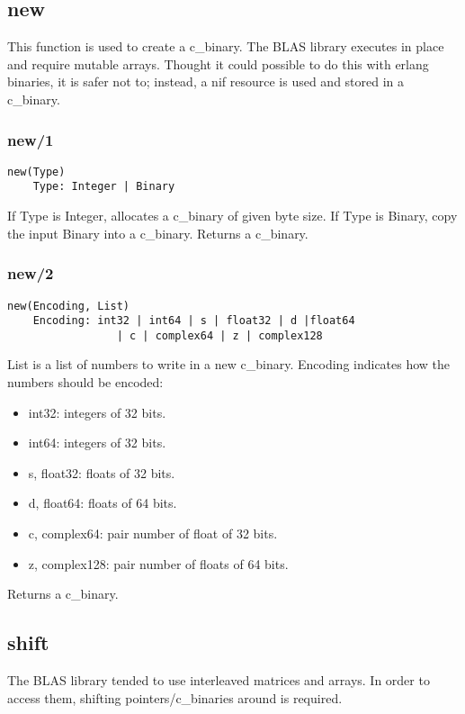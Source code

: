 \documentclass{article}
\begin{document}
    \subsection{new}
    This function is used to create a c\_binary. The BLAS library executes in place and require mutable arrays. Thought it could possible to do this with erlang binaries, it is safer not to; instead,  a nif resource is used and stored in a c\_binary.

    \subsubsection{new/1}
        \begin{verbatim}
new(Type)
    Type: Integer | Binary
        \end{verbatim}
        If Type is Integer, allocates a c\_binary of given byte size.\newline
        If Type is Binary, copy the input Binary into a c\_binary.\newline
        Returns a c\_binary.

    \subsubsection{new/2}
        \begin{verbatim}
new(Encoding, List)
    Encoding: int32 | int64 | s | float32 | d |float64
                 | c | complex64 | z | complex128
        \end{verbatim}
        List is a list of numbers to write in a new c\_binary.\newline
        Encoding indicates how the numbers should be encoded:
        \begin{itemize}
            \item int32: integers of 32 bits.
            \item int64: integers of 32 bits.
            \item s, float32: floats of 32 bits.
            \item d, float64: floats of 64 bits.
            \item c, complex64: pair number of float of 32 bits.
            \item z, complex128: pair number of floats of 64 bits.
        \end{itemize}
        Returns a c\_binary.
    
    \subsection{shift}
    The BLAS library tended to use interleaved matrices and arrays. In order to access them, shifting pointers/c\_binaries around is required.
\end{document}
